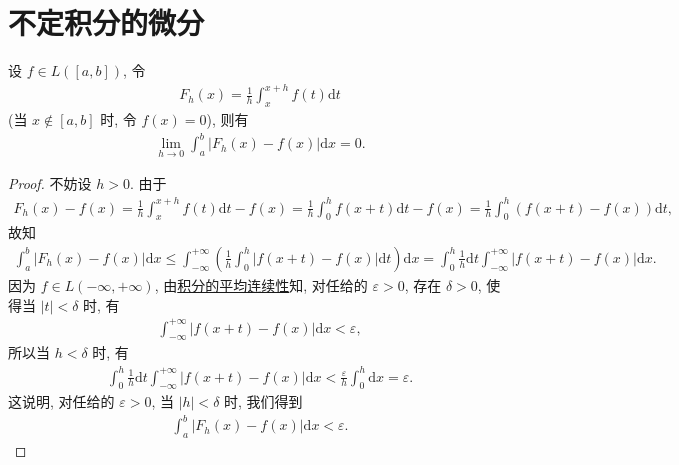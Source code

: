 \documentclass[../../main.tex]{subfiles}%
\begin{document}
\section{不定积分的微分}

\begin{lemma}\label{lemma:引理变限积分的平均连续性}
设 $f\in L([a,b])$, 令
\begin{align*}
F_h(x) = \frac{1}{h}\int_x^{x+h} f(t)\mathrm{d}t
\end{align*}
(当 $x\notin [a,b]$ 时, 令 $f(x)=0$), 则有
\begin{align*}
\lim_{h\to 0}\int_a^b |F_h(x)-f(x)|\mathrm{d}x = 0.
\end{align*}
\end{lemma}
\begin{proof}
不妨设 $h>0$. 由于
\begin{align*}
F_h(x)-f(x) = \frac{1}{h}\int_x^{x+h} f(t)\mathrm{d}t - f(x) 
= \frac{1}{h}\int_0^h f(x+t)\mathrm{d}t - f(x) 
= \frac{1}{h}\int_0^h (f(x+t)-f(x))\mathrm{d}t,
\end{align*}
故知
\begin{align*}
\int_a^b |F_h(x)-f(x)|\mathrm{d}x \leqslant \int_{-\infty}^{+\infty} \left(\frac{1}{h}\int_0^h |f(x+t)-f(x)|\mathrm{d}t\right)\mathrm{d}x 
= \int_0^h \frac{1}{h}\mathrm{d}t \int_{-\infty}^{+\infty} |f(x+t)-f(x)|\mathrm{d}x.
\end{align*}
因为 $f\in L(-\infty,+\infty)$, 由\hyperref[theorem:积分的平均连续性]{积分的平均连续性}知, 对任给的 $\varepsilon>0$, 存在 $\delta>0$, 使得当 $|t|<\delta$ 时, 有
\begin{align*}
\int_{-\infty}^{+\infty} |f(x+t)-f(x)|\mathrm{d}x < \varepsilon,
\end{align*}
所以当 $h<\delta$ 时, 有
\begin{align*}
\int_0^h \frac{1}{h}\mathrm{d}t \int_{-\infty}^{+\infty} |f(x+t)-f(x)|\mathrm{d}x < \frac{\varepsilon}{h}\int_0^h \mathrm{d}x = \varepsilon.
\end{align*}
这说明, 对任给的 $\varepsilon>0$, 当 $|h|<\delta$ 时, 我们得到
\begin{align*}
\int_a^b |F_h(x)-f(x)|\mathrm{d}x < \varepsilon.
\end{align*}
\end{proof}
\end{document}

